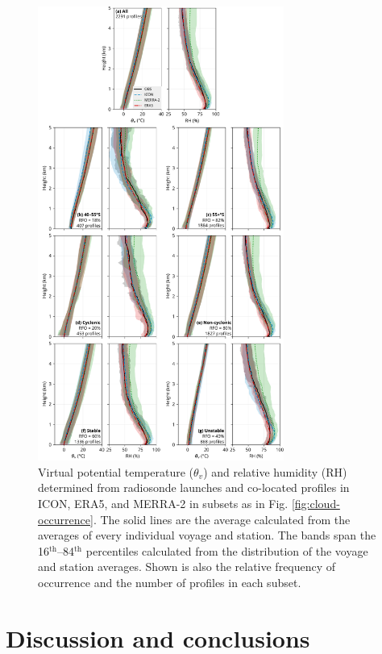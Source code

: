 \documentclass[12pt,a4paper]{article}
\begin{document}
\begin{figure}
\centering
\includegraphics[width=0.72\textwidth]{img/theta_hur.pdf}
\caption{
Virtual potential temperature ($\theta_v$) and relative humidity (RH)
determined from radiosonde launches and co-located profiles in
ICON, ERA5, and MERRA-2 in subsets as in Fig. \ref{fig:cloud-occurrence}.
The solid lines are the average calculated from the averages of every
individual voyage and station. The bands span the
16$^\mathrm{th}$--84$^\mathrm{th}$ percentiles calculated from the distribution
of the voyage and station averages. Shown is also the relative frequency of
occurrence and the number of profiles in each subset.
}
\label{fig:potential-temperature}
\end{figure}

\section{Discussion and conclusions}
\end{document}
